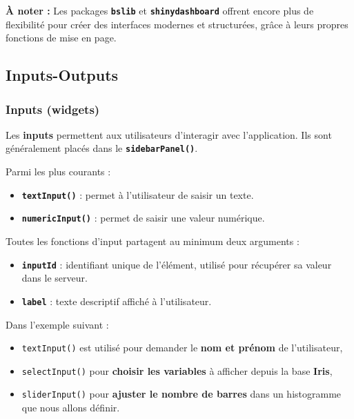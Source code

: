 \documentclass[
]{article}
\providecommand{\tightlist}{%
  \setlength{\itemsep}{0pt}\setlength{\parskip}{0pt}}
\begin{document}
\textbf{À noter :} Les packages \textbf{\texttt{bslib}} et
\textbf{\texttt{shinydashboard}} offrent encore plus de flexibilité pour
créer des interfaces modernes et structurées, grâce à leurs propres
fonctions de mise en page.

\subsection{Inputs-Outputs}\label{inputs-outputs}

\subsubsection{Inputs (widgets)}\label{inputs-widgets}

Les \textbf{inputs} permettent aux utilisateurs d'interagir avec
l'application. Ils sont généralement placés dans le
\textbf{\texttt{sidebarPanel()}}.

Parmi les plus courants :

\begin{itemize}
\tightlist
\item
  \textbf{\texttt{textInput()}} : permet à l'utilisateur de saisir un
  texte.\\
\item
  \textbf{\texttt{numericInput()}} : permet de saisir une valeur
  numérique.
\end{itemize}

Toutes les fonctions d'input partagent au minimum deux arguments :

\begin{itemize}
\tightlist
\item
  \textbf{\texttt{inputId}} : identifiant unique de l'élément, utilisé
  pour récupérer sa valeur dans le serveur.\\
\item
  \textbf{\texttt{label}} : texte descriptif affiché à l'utilisateur.
\end{itemize}

Dans l'exemple suivant :

\begin{itemize}
\tightlist
\item
  \texttt{textInput()} est utilisé pour demander le \textbf{nom et
  prénom} de l'utilisateur,\\
\item
  \texttt{selectInput()} pour \textbf{choisir les variables} à afficher
  depuis la base \textbf{Iris},\\
\item
  \texttt{sliderInput()} pour \textbf{ajuster le nombre de barres} dans
  un histogramme que nous allons définir.
\end{itemize}
\end{document}
